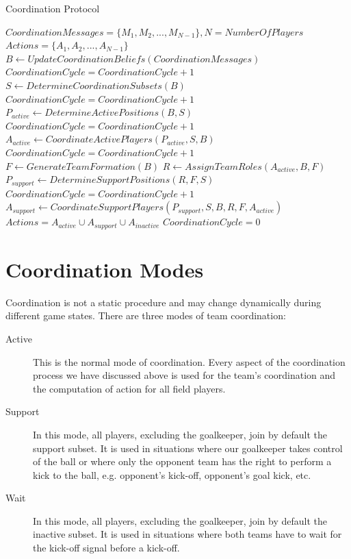 \begin{algorithm}[ht!]
\caption{Coordination Protocol }
\label{CoordinationAlgorithm}
\begin{algorithmic}[1]
\begin{small}
$Coordination Messages = \lbrace M_{1},M_{2},...,M_{N-1} \rbrace, N = Number Of Players $
$Actions = \lbrace A_{1},A_{2},...,A_{N-1} \rbrace$
\STATE
{}
\STATE $B \leftarrow Update Coordination Beliefs(Coordination Messages) $
\STATE $CoordinationCycle = CoordinationCycle + 1$
\STATE $S \leftarrow Determine Coordination Subsets(B) $
\STATE $CoordinationCycle = CoordinationCycle + 1$
\STATE $P_{active} \leftarrow Determine Active Positions(B,S) $
\STATE $CoordinationCycle = CoordinationCycle + 1$
\STATE $A_{active} \leftarrow Coordinate Active Players(P_{active},S,B) $
\STATE $CoordinationCycle = CoordinationCycle + 1$
\STATE $ F \leftarrow Generate Team Formation(B) $
\STATE $ R \leftarrow Assign Team Roles(A_{active},B,F) $
\STATE $ P_{support} \leftarrow Determine Support Positions(R,F,S) $
\STATE $CoordinationCycle = CoordinationCycle + 1$
\STATE $A_{support} \leftarrow Coordinate Support Players(P_{support},S,B,R,F,A_{active}) $
\STATE $Actions = A_{active} \cup A_{support} \cup A_{inactive}$
\STATE $CoordinationCycle = 0$
\ENDIF
\end{small}
\end{algorithmic}
\end{algorithm}


\section{Coordination Modes}

Coordination is not a static procedure and may change dynamically during different game states. There are three modes of team coordination:
\begin{description}
\item[Active] This is the normal mode of coordination. Every aspect of the coordination process we have discussed above is used for the team's coordination and the computation of action for all field players.
\item[Support] In this mode, all players, excluding the goalkeeper, join by default the support subset. It is used in situations where our goalkeeper takes control of the ball or where only the opponent team has the right to perform a kick to the ball, e.g. opponent's kick-off,  opponent's goal kick, etc.
\item[Wait] In this mode, all players, excluding the goalkeeper, join by default the inactive subset. It is used in situations where both teams have to wait for the kick-off signal before a kick-off.
\end{description}


